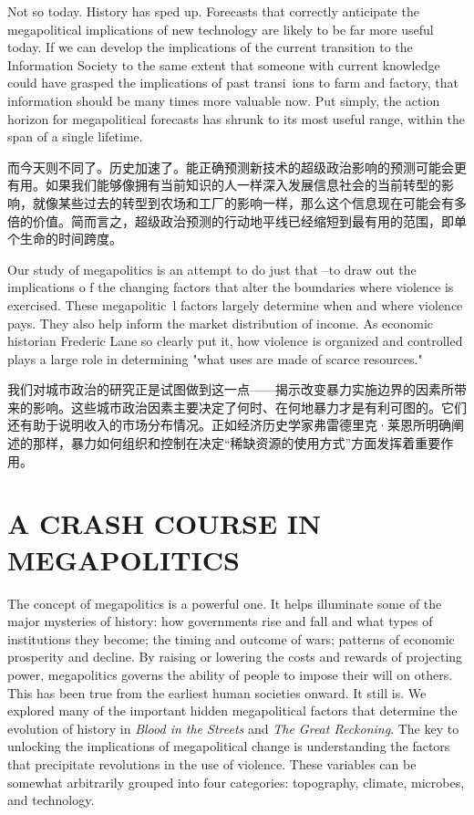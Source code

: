 \begin{Parallel}{97mm}{72mm}
  \ParallelLText
  {Not so today. History has sped up. Forecasts that correctly anticipate the megapolitical implications of new technology are likely to be far more useful today. If we can develop the implications of the current transition to the Information Society to the same extent that someone with current knowledge could have grasped the implications of past transi~ions to farm and factory, that information should be many times more valuable now. Put simply, the action horizon for megapolitical forecasts has shrunk to its most useful range, within the span of a single lifetime.}
  
  \ParallelRText
  {而今天则不同了。历史加速了。能正确预测新技术的超级政治影响的预测可能会更有用。如果我们能够像拥有当前知识的人一样深入发展信息社会的当前转型的影响，就像某些过去的转型到农场和工厂的影响一样，那么这个信息现在可能会有多倍的价值。简而言之，超级政治预测的行动地平线已经缩短到最有用的范围，即单个生命的时间跨度。}
  \ParallelPar


  \ParallelLText
  {Our study of megapolitics is an attempt to do just that --to draw out the implications o f the changing factors that alter the boundaries where violence is exercised. These megapolitic~l factors largely determine when and where violence pays. They also help inform the market distribution of income. As economic historian Frederic Lane so clearly put it, how violence is organized and controlled plays a large role in determining "what uses are made of scarce resources." }
  
  \ParallelRText
  {我们对城市政治的研究正是试图做到这一点——揭示改变暴力实施边界的因素所带来的影响。这些城市政治因素主要决定了何时、在何地暴力才是有利可图的。它们还有助于说明收入的市场分布情况。正如经济历史学家弗雷德里克·莱恩所明确阐述的那样，暴力如何组织和控制在决定“稀缺资源的使用方式”方面发挥着重要作用。}
  \ParallelPar

  \section{A CRASH COURSE IN MEGAPOLITICS}

  \ParallelLText
  {The concept of megapolitics is a powerful one. It helps illuminate some of the major mysteries of history: how governments rise and fall and what types of institutions they become; the timing and outcome of wars; patterns of economic prosperity and decline. By raising or lowering the costs and rewards of projecting power, megapolitics governs the ability of people to impose their will on others. This has been true from the earliest human societies onward. It still is. We explored many of the important hidden megapolitical factors that determine the evolution of history in \emph{Blood in the Streets} and \emph{The Great Reckoning}. The key to unlocking the implications of megapolitical change is understanding the factors that precipitate revolutions in the use of violence. These variables can be somewhat arbitrarily grouped into four categories: topography, climate, microbes, and technology.}
  

\end{Parallel}
